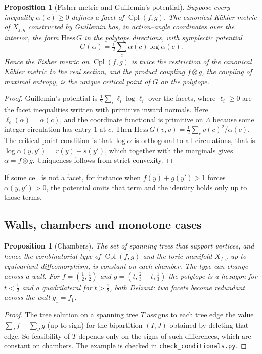 \documentclass[11pt]{article}
\newtheorem{proposition}[theorem]{Proposition}
\theoremstyle{definition}
\theoremstyle{remark}
\newcommand{\Cpl}{\operatorname{Cpl}}
\begin{document}
\begin{proposition}[Fisher metric and Guillemin's potential]\label{prop:guillemin}
Suppose every inequality $\alpha(c)\ge0$ defines a facet of $\Cpl(f,g)$. The canonical K\"ahler metric
of $X_{f,g}$ constructed by Guillemin \cite{Guillemin1994} has, in action--angle coordinates over the
interior, the form $\mathrm{Hess}\,G$ in the polytope directions, with symplectic potential
\[
G(\alpha)=\tfrac12\sum_{c}\alpha(c)\log\alpha(c).
\]
Hence the Fisher metric on $\Cpl(f,g)$ is twice the restriction of the canonical K\"ahler metric to the
real section, and the product coupling $f\otimes g$, the coupling of maximal entropy, is the unique
critical point of $G$ on the polytope.
\end{proposition}
\begin{proof}
Guillemin's potential is $\tfrac12\sum_i\ell_i\log\ell_i$ over the facets, where $\ell_i\ge0$ are the
facet inequalities written with primitive inward normals. Here $\ell_c(\alpha)=\alpha(c)$, and the
coordinate functional is primitive on $\Lambda$ because some integer circulation has entry $1$ at $c$.
Then $\mathrm{Hess}\,G(v,v)=\tfrac12\sum_cv(c)^2/\alpha(c)$. The critical-point condition is that
$\log\alpha$ is orthogonal to all circulations, that is $\log\alpha(y,y')=r(y)+s(y')$, which together with
the marginals gives $\alpha=f\otimes g$. Uniqueness follows from strict convexity.
\end{proof}

If some cell is not a facet, for instance when $f(y)+g(y')>1$ forces $\alpha(y,y')>0$, the potential
omits that term and the identity holds only up to those terms.

\subsection{Walls, chambers and monotone cases}

\begin{proposition}[Chambers]\label{prop:chambers}
The set of spanning trees that support vertices, and hence the combinatorial type of $\Cpl(f,g)$ and
the toric manifold $X_{f,g}$ up to equivariant diffeomorphism, is constant on each chamber. The type
can change across a wall. For $f=(\tfrac12,\tfrac12)$ and $g=(t,\tfrac23-t,\tfrac13)$ the polytope is a
hexagon for $t<\tfrac12$ and a quadrilateral for $t>\tfrac12$, both Delzant: two facets become redundant
across the wall $g_1=f_1$.
\end{proposition}
\begin{proof}
The tree solution on a spanning tree $T$ assigns to each tree edge the value $\sum_If-\sum_Jg$ (up to
sign) for the bipartition $(I,J)$ obtained by deleting that edge. So feasibility of $T$ depends only on
the signs of such differences, which are constant on chambers. The example is checked in
\texttt{check\_conditionals.py}.
\end{proof}
\end{document}
